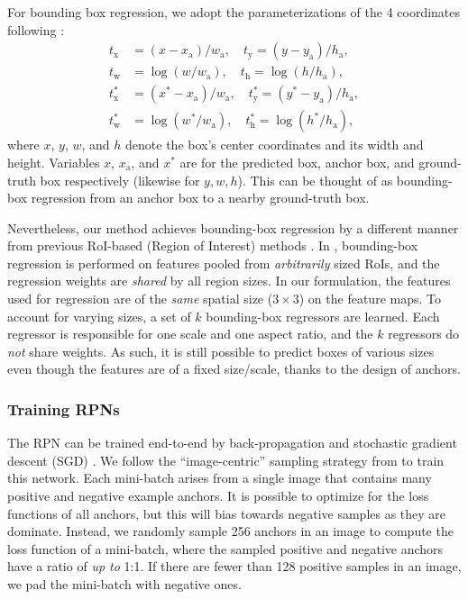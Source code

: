 \documentclass[10pt,journal,cspaper,compsoc]{IEEEtran}
\begin{document}
For bounding box regression, we adopt the parameterizations of the 4 coordinates following \cite{Girshick2014}:
\begin{equation}
\begin{aligned}
t_{\textrm{x}} &=  (x - x_{\textrm{a}})/w_{\textrm{a}},\quad
t_{\textrm{y}} = (y - y_{\textrm{a}})/h_{\textrm{a}},\\
t_{\textrm{w}} &= \log(w / w_{\textrm{a}}), \quad
t_{\textrm{h}} = \log(h / h_{\textrm{a}}),\\
t^{*}_{\textrm{x}} &=  (x^{*} - x_{\textrm{a}})/w_{\textrm{a}},\quad
t^{*}_{\textrm{y}} = (y^{*} - y_{\textrm{a}})/h_{\textrm{a}},\\
t^{*}_{\textrm{w}} &= \log(w^{*} / w_{\textrm{a}}),\quad
t^{*}_{\textrm{h}} = \log(h^{*} / h_{\textrm{a}}),
\end{aligned}
\end{equation}
where $x$, $y$, $w$, and $h$ denote the box's center coordinates and its width and height.
Variables $x$, $x_{\textrm{a}}$, and $x^{*}$ are for the predicted box, anchor box, and ground-truth box respectively (likewise for $y, w, h$). This can be thought of as bounding-box regression from an anchor box to a nearby ground-truth box.

Nevertheless, our method achieves bounding-box regression by a different manner from previous RoI-based (Region of Interest) methods \cite{He2014,Girshick2015a}.
In \cite{He2014,Girshick2015a}, bounding-box regression is performed on features pooled from \emph{arbitrarily} sized RoIs, and the regression weights are \emph{shared} by all region sizes. In our formulation, the features used for regression are of the \emph{same} spatial size ($3 \times 3$) on the feature maps. To account for varying sizes, a set of $k$ bounding-box regressors are learned. Each regressor is responsible for one scale and one aspect ratio, and the $k$ regressors do \emph{not} share weights. As such, it is still possible to predict boxes of various sizes even though the features are of a fixed size/scale, thanks to the design of anchors.

\subsubsection{Training RPNs}
\label{sec:training_rpn}

The RPN can be trained end-to-end by back-propagation and stochastic gradient descent (SGD) \cite{LeCun1989}.
We follow the ``image-centric'' sampling strategy from \cite{Girshick2015a} to train this network. Each mini-batch arises from a single image that contains many positive and negative example anchors. It is possible to optimize for the loss functions of all anchors, but this will bias towards negative samples as they are dominate. Instead, we randomly sample 256 anchors in an image to compute the loss function of a mini-batch, where the sampled positive and negative anchors have a ratio of \emph{up to} 1:1. If there are fewer than 128 positive samples in an image, we pad the mini-batch with negative ones.
\end{document}
